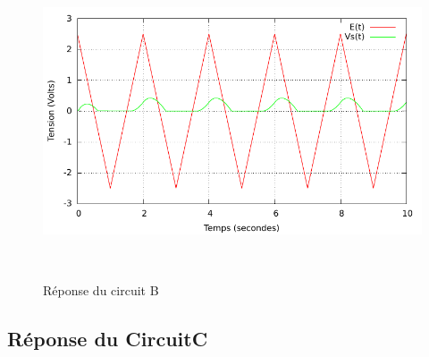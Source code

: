 \documentclass[a4paper,11pt]{article}
\begin{document}
\begin{figure}[h!]
\begin{minipage}[b]{0.5\linewidth}
   \end{minipage}
  \begin{minipage}[b]{0.5\linewidth}   
      \centering \includegraphics[scale=.68]{CBtriangle.pdf}
   \end{minipage}\\
 \caption{ Réponse du circuit B}
\end{figure}
\newpage
  \subsection{Réponse du CircuitC}
\end{document}
